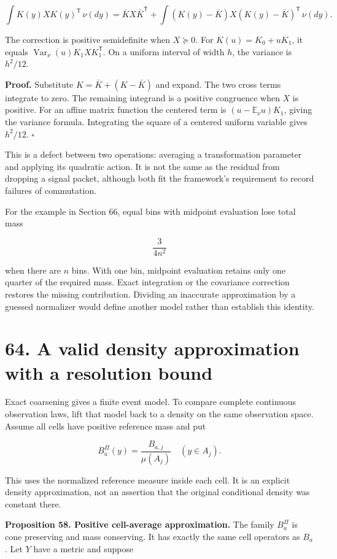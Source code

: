 \documentclass[11pt,letterpaper]{article}
\begin{document}
\[
\boxed{
\int K(y)XK(y)^{\mathsf T}\,\nu(dy)
=\bar KX\bar K^{\mathsf T}
+\int (K(y)-\bar K)X(K(y)-\bar K)^{\mathsf T}\,\nu(dy).
}
\]

The correction is positive semidefinite when \(X\succeq0\). For
\(K(u)=K_0+uK_1\), it equals
\(\operatorname{Var}_\nu(u)K_1XK_1^{\mathsf T}\). On a uniform interval
of width \(h\), the variance is \(h^2/12\).

\textbf{Proof.} Substitute \(K=\bar K+(K-\bar K)\) and expand. The two
cross terms integrate to zero. The remaining integrand is a positive
congruence when \(X\) is positive. For an affine matrix function the
centered term is \((u-\mathbb E_\nu u)K_1\), giving the variance
formula. Integrating the square of a centered uniform variable gives
\(h^2/12\). \(\square\)

This is a defect between two operations: averaging a transformation
parameter and applying its quadratic action. It is not the same as the
residual from dropping a signal packet, although both fit the
framework's requirement to record failures of commutation.

For the example in Section 66, equal bins with midpoint evaluation lose
total mass

\[
\boxed{\frac{3}{4n^2}}
\]

when there are \(n\) bins. With one bin, midpoint evaluation retains
only one quarter of the required mass. Exact integration or the
covariance correction restores the missing contribution. Dividing an
inaccurate approximation by a guessed normalizer would define another
model rather than establish this identity.

\section{64. A valid density approximation with a resolution
bound}\label{a-valid-density-approximation-with-a-resolution-bound}

Exact coarsening gives a finite event model. To compare complete
continuous observation laws, lift that model back to a density on the
same observation space. Assume all cells have positive reference mass
and put

\[
B_a^\Pi(y)=\frac{B_{a,j}}{\mu(A_j)}\quad(y\in A_j).
\]

This uses the normalized reference measure inside each cell. It is an
explicit density approximation, not an assertion that the original
conditional density was constant there.

\textbf{Proposition 58. Positive cell-average approximation.} The family
\(B_a^\Pi\) is cone preserving and mass conserving. It has exactly the
same cell operators as \(B_a\). Let \(Y\) have a metric and suppose
\end{document}
